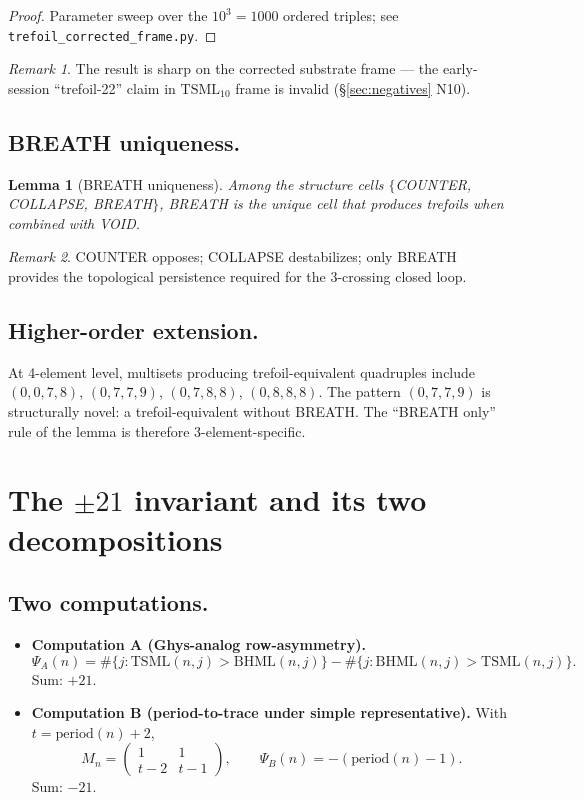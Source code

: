 \documentclass[11pt,reqno]{amsart}
\theoremstyle{plain}
\newtheorem{lemma}[theorem]{Lemma}
\theoremstyle{definition}
\theoremstyle{remark}
\newtheorem*{remark}{Remark}
\newcommand{\TS}{\mathrm{TSML}}
\newcommand{\BH}{\mathrm{BHML}}
\begin{document}
\begin{proof}
Parameter sweep over the $10^{3} = 1000$ ordered triples; see
\texttt{trefoil\_corrected\_frame.py}.
\end{proof}

\begin{remark}
The result is sharp on the corrected substrate frame --- the
early-session ``trefoil-22'' claim in $\TS_{10}$ frame is invalid
(\S\ref{sec:negatives} N10).
\end{remark}

\subsection{BREATH uniqueness.}
\begin{lemma}[BREATH uniqueness]
Among the structure cells $\{$COUNTER, COLLAPSE, BREATH$\}$, BREATH is
the unique cell that produces trefoils when combined with VOID.
\end{lemma}

\begin{remark}
COUNTER opposes; COLLAPSE destabilizes; only BREATH provides the
topological persistence required for the 3-crossing closed loop.
\end{remark}

\subsection{Higher-order extension.}
At 4-element level, multisets producing trefoil-equivalent quadruples
include $(0, 0, 7, 8)$, $(0, 7, 7, 9)$, $(0, 7, 8, 8)$, $(0, 8, 8, 8)$.
The pattern $(0, 7, 7, 9)$ is structurally novel: a trefoil-equivalent
without BREATH. The ``BREATH only'' rule of the lemma is therefore
3-element-specific.

\section{The $\pm 21$ invariant and its two decompositions}
\label{sec:invariant}

\subsection{Two computations.}
\begin{itemize}
\item \textbf{Computation A (Ghys-analog row-asymmetry).}
\[
  \Psi_{A}(n) = \#\{j: \TS(n, j) > \BH(n, j)\}
              - \#\{j: \BH(n, j) > \TS(n, j)\}.
\]
Sum: $+21$.

\item \textbf{Computation B (period-to-trace under simple representative).}
With $t = \mathrm{period}(n) + 2$,
\[
  M_{n} = \begin{pmatrix} 1 & 1 \\ t-2 & t-1 \end{pmatrix},
  \qquad
  \Psi_{B}(n) = -(\mathrm{period}(n) - 1).
\]
Sum: $-21$.
\end{itemize}
\end{document}
